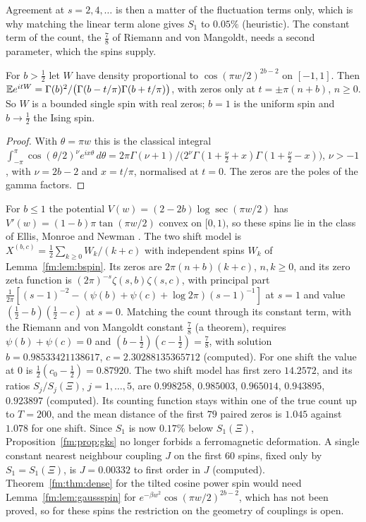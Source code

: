 Agreement at $s=2,4,\dots$ is then a matter of the fluctuation terms only, which is why matching the linear term alone gives $S_1$ to $0.05\%$ (heuristic). The constant term of the count, the $\frac78$ of Riemann and von Mangoldt, needs a second parameter, which the spins supply.

\begin{lemma}[proved]\label{fm:lem:bspin}
For $b>\frac12$ let $W$ have density proportional to $\cos(\pi w/2)^{2b-2}$ on $[-1,1]$. Then $\mathbb{E} e^{itW}=\Gamma(b)^2/\big(\Gamma(b-t/\pi)\Gamma(b+t/\pi)\big)$, with zeros only at $t=\pm\pi(n+b)$, $n\ge0$. So $W$ is a bounded single spin with real zeros; $b=1$ is the uniform spin and $b\to\frac12$ the Ising spin.
\end{lemma}

\begin{proof}
With $\theta=\pi w$ this is the classical integral $\int_{-\pi}^{\pi}\cos(\theta/2)^\nu e^{ix\theta}\,d\theta=2\pi\Gamma(\nu+1)/\big(2^\nu\Gamma(1+\frac\nu2+x)\Gamma(1+\frac\nu2-x)\big)$, $\nu>-1$, with $\nu=2b-2$ and $x=t/\pi$, normalised at $t=0$. The zeros are the poles of the gamma factors.
\end{proof}

For $b\le1$ the potential $V(w)=(2-2b)\log\sec(\pi w/2)$ has $V'(w)=(1-b)\pi\tan(\pi w/2)$ convex on $[0,1)$, so these spins lie in the class of Ellis, Monroe and Newman \cite{EMN76}. The two shift model is $X^{(b,c)}=\frac12\sum_{k\ge0}W_k/(k+c)$ with independent spins $W_k$ of Lemma~\ref{fm:lem:bspin}. Its zeros are $2\pi(n+b)(k+c)$, $n,k\ge0$, and its zero zeta function is $(2\pi)^{-s}\zeta(s,b)\zeta(s,c)$, with principal part $\frac1{2\pi}[(s-1)^{-2}-(\psi(b)+\psi(c)+\log2\pi)(s-1)^{-1}]$ at $s=1$ and value $(\frac12-b)(\frac12-c)$ at $s=0$. Matching the count through its constant term, with the Riemann and von Mangoldt constant $\frac78$ (a theorem), requires $\psi(b)+\psi(c)=0$ and $(b-\frac12)(c-\frac12)=\frac78$, with solution $b=0.98533421138617$, $c=2.30288135365712$ (computed). For one shift the value at $0$ is $\frac12(c_0-\frac12)=0.87920$. The two shift model has first zero $14.2572$, and its ratios $S_j/S_j(\Xi)$, $j=1,\dots,5$, are $0.998258$, $0.985003$, $0.965014$, $0.943895$, $0.923897$ (computed). Its counting function stays within one of the true count up to $T=200$, and the mean distance of the first $79$ paired zeros is $1.045$ against $1.078$ for one shift. Since $S_1$ is now $0.17\%$ below $S_1(\Xi)$, Proposition~\ref{fm:prop:gks} no longer forbids a ferromagnetic deformation. A single constant nearest neighbour coupling $J$ on the first $60$ spins, fixed only by $S_1=S_1(\Xi)$, is $J=0.00332$ to first order in $J$ (computed). Theorem~\ref{fm:thm:dense} for the tilted cosine power spin would need Lemma~\ref{fm:lem:gaussspin} for $e^{-\beta w^2}\cos(\pi w/2)^{2b-2}$, which has not been proved, so for these spins the restriction on the geometry of couplings is open.

